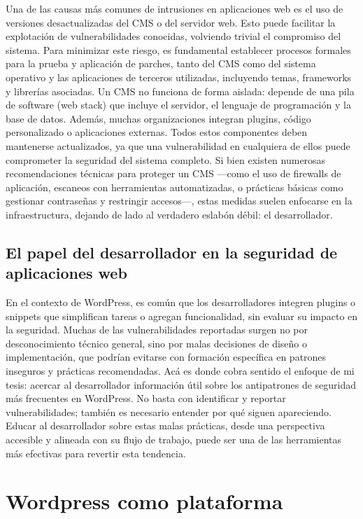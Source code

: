 Una de las causas más comunes de intrusiones en aplicaciones web es el uso de versiones desactualizadas del CMS o del servidor web. Esto puede facilitar la explotación de vulnerabilidades conocidas, volviendo trivial el compromiso del sistema. Para minimizar este riesgo, es fundamental establecer procesos formales para la prueba y aplicación de parches, tanto del CMS como del sistema operativo y las aplicaciones de terceros utilizadas, incluyendo temas, frameworks y librerías asociadas.
Un CMS no funciona de forma aislada: depende de una pila de software (web stack) que incluye el servidor, el lenguaje de programación y la base de datos. Además, muchas organizaciones integran plugins, código personalizado o aplicaciones externas. Todos estos componentes deben mantenerse actualizados, ya que una vulnerabilidad en cualquiera de ellos puede comprometer la seguridad del sistema completo.
Si bien existen numerosas recomendaciones técnicas para proteger un CMS —como el uso de firewalls de aplicación, escaneos con herramientas automatizadas, o prácticas básicas como gestionar contraseñas y restringir accesos—, estas medidas suelen enfocarse en la infraestructura, dejando de lado al verdadero eslabón débil: el desarrollador.

\subsection{El papel del desarrollador en la seguridad de aplicaciones web}

En el contexto de WordPress, es común que los desarrolladores integren plugins o snippets que simplifican tareas o agregan funcionalidad, sin evaluar su impacto en la seguridad. Muchas de las vulnerabilidades reportadas surgen no por desconocimiento técnico general, sino por malas decisiones de diseño o implementación, que podrían evitarse con formación específica en patrones inseguros y prácticas recomendadas.
Acá es donde cobra sentido el enfoque de mi tesis: acercar al desarrollador información útil sobre los antipatrones de seguridad más frecuentes en WordPress. No basta con identificar y reportar vulnerabilidades; también es necesario entender por qué siguen apareciendo. Educar al desarrollador sobre estas malas prácticas, desde una perspectiva accesible y alineada con su flujo de trabajo, puede ser una de las herramientas más efectivas para revertir esta tendencia.


\section{Wordpress como plataforma}

